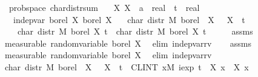 \documentclass{article}
\theoremstyle{definition}
\begin{document}
\begin{isabellebody}
\isamarkupfalse%
\ {\isacharparenleft}\ prob{\isacharunderscore}space{\isacharparenright}\ char{\isacharunderscore}distr{\isacharunderscore}sum{\isacharcolon}\isanewline
\ \ \ X{}\ X{}\ {\isacharcolon}{\isacharcolon}\ {\isachardoublequoteopen}{\isacharprime}a\ {\isasymRightarrow}\ real{\isachardoublequoteclose}\ \ t\ {\isacharcolon}{\isacharcolon}\ real\isanewline
\ \ \ {\isachardoublequoteopen}indep{\isacharunderscore}var\ borel\ X{}\ borel\ X{}{\isachardoublequoteclose}\isanewline
\ \ \ {\isachardoublequoteopen}char\ {\isacharparenleft}distr\ M\ borel\ {\isacharparenleft}{\isasymlambda}{\isasymomega}{\isachardot}\ X{}\ {\isasymomega}\ {\isacharplus}\ X{}\ {\isasymomega}{\isacharparenright}{\isacharparenright}\ t\ {\isacharequal}\isanewline
\ \ \ \ char\ {\isacharparenleft}distr\ M\ borel\ X{}{\isacharparenright}\ t\ {\isacharasterisk}\ char\ {\isacharparenleft}distr\ M\ borel\ X{}{\isacharparenright}\ t{\isachardoublequoteclose}\isanewline
{}\isamarkupfalse%
\ {\isacharminus}\isanewline
\ \ \isamarkupfalse%
\ assms\ \isamarkupfalse%
\ {\isacharbrackleft}measurable{\isacharbrackright}{\isacharcolon}\ {\isachardoublequoteopen}random{\isacharunderscore}variable\ borel\ X{}{\isachardoublequoteclose}\ \isamarkupfalse%
\ {\isacharparenleft}elim\ indep{\isacharunderscore}var{\isacharunderscore}rv{}{\isacharparenright}\isanewline
\ \ \isamarkupfalse%
\ assms\ \isamarkupfalse%
\ {\isacharbrackleft}measurable{\isacharbrackright}{\isacharcolon}\ {\isachardoublequoteopen}random{\isacharunderscore}variable\ borel\ X{}{\isachardoublequoteclose}\ \isamarkupfalse%
\ {\isacharparenleft}elim\ indep{\isacharunderscore}var{\isacharunderscore}rv{}{\isacharparenright}\isanewline
\isanewline
\ \ \isamarkupfalse%
\ {\isachardoublequoteopen}char\ {\isacharparenleft}distr\ M\ borel\ {\isacharparenleft}{\isasymlambda}{\isasymomega}{\isachardot}\ X{}\ {\isasymomega}\ {\isacharplus}\ X{}\ {\isasymomega}{\isacharparenright}{\isacharparenright}\ t\ {\isacharequal}\ {\isacharparenleft}CLINT\ x{\isacharbar}M{\isachardot}\ iexp\ {\isacharparenleft}t\ {\isacharasterisk}\ {\isacharparenleft}X{}\ x\ {\isacharplus}\ X{}\ x{\isacharparenright}{\isacharparenright}{\isacharparenright}{\isachardoublequoteclose}\isanewline

\end{isabellebody}
\end{document}
